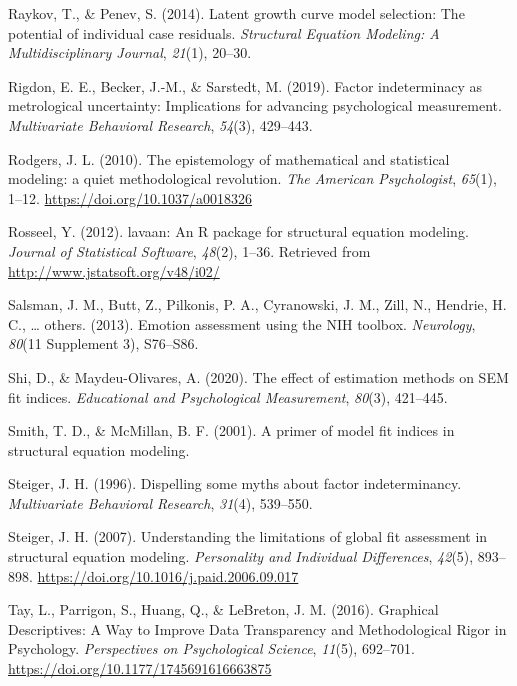 \documentclass[
  english,
  man]{apa6}
\newlength{\cslhangindent}
\newenvironment{cslreferences}%
  {\setlength{\parindent}{0pt}%
  \everypar{\setlength{\hangindent}{\cslhangindent}}\ignorespaces}%
  {\par}
\begin{document}
\begin{cslreferences}
\leavevmode\hypertarget{ref-raykov2014latent}{}%
Raykov, T., \& Penev, S. (2014). Latent growth curve model selection: The potential of individual case residuals. \emph{Structural Equation Modeling: A Multidisciplinary Journal}, \emph{21}(1), 20--30.

\leavevmode\hypertarget{ref-rigdon2019factor}{}%
Rigdon, E. E., Becker, J.-M., \& Sarstedt, M. (2019). Factor indeterminacy as metrological uncertainty: Implications for advancing psychological measurement. \emph{Multivariate Behavioral Research}, \emph{54}(3), 429--443.

\leavevmode\hypertarget{ref-rodgers_epistemology_2010}{}%
Rodgers, J. L. (2010). The epistemology of mathematical and statistical modeling: a quiet methodological revolution. \emph{The American Psychologist}, \emph{65}(1), 1--12. \url{https://doi.org/10.1037/a0018326}

\leavevmode\hypertarget{ref-lavaan}{}%
Rosseel, Y. (2012). lavaan: An R package for structural equation modeling. \emph{Journal of Statistical Software}, \emph{48}(2), 1--36. Retrieved from \url{http://www.jstatsoft.org/v48/i02/}

\leavevmode\hypertarget{ref-salsman2013emotion}{}%
Salsman, J. M., Butt, Z., Pilkonis, P. A., Cyranowski, J. M., Zill, N., Hendrie, H. C., \ldots{} others. (2013). Emotion assessment using the NIH toolbox. \emph{Neurology}, \emph{80}(11 Supplement 3), S76--S86.

\leavevmode\hypertarget{ref-shi2020effect}{}%
Shi, D., \& Maydeu-Olivares, A. (2020). The effect of estimation methods on SEM fit indices. \emph{Educational and Psychological Measurement}, \emph{80}(3), 421--445.

\leavevmode\hypertarget{ref-smith2001primer}{}%
Smith, T. D., \& McMillan, B. F. (2001). A primer of model fit indices in structural equation modeling.

\leavevmode\hypertarget{ref-steiger1996dispelling}{}%
Steiger, J. H. (1996). Dispelling some myths about factor indeterminancy. \emph{Multivariate Behavioral Research}, \emph{31}(4), 539--550.

\leavevmode\hypertarget{ref-Steiger2007}{}%
Steiger, J. H. (2007). Understanding the limitations of global fit assessment in structural equation modeling. \emph{Personality and Individual Differences}, \emph{42}(5), 893--898. \url{https://doi.org/10.1016/j.paid.2006.09.017}

\leavevmode\hypertarget{ref-Tay2016a}{}%
Tay, L., Parrigon, S., Huang, Q., \& LeBreton, J. M. (2016). Graphical Descriptives: A Way to Improve Data Transparency and Methodological Rigor in Psychology. \emph{Perspectives on Psychological Science}, \emph{11}(5), 692--701. \url{https://doi.org/10.1177/1745691616663875}


\end{cslreferences}
\end{document}
